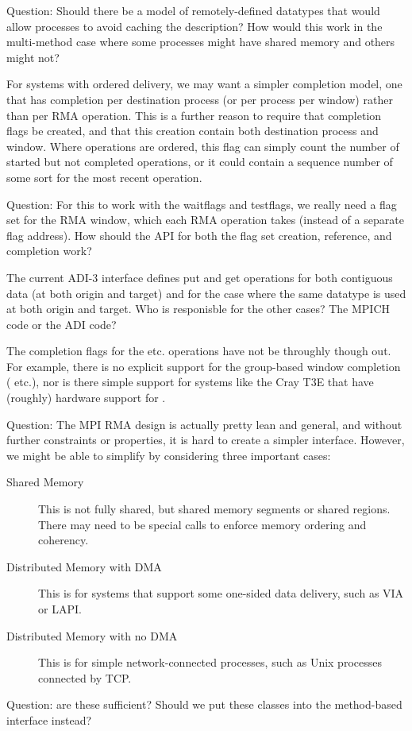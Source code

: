 \documentclass{article}
\begin{document}
Question:  Should there be a model of remotely-defined datatypes that
would allow processes to avoid caching the description?  How would
this work in the multi-method case where some processes might have
shared memory and others might not?

For systems with ordered delivery, we may want a simpler completion
model, one that has completion per destination process (or per process
per window) rather than per RMA operation.  This is a further reason
to require that completion flags be created, and that this creation
contain both destination process and window.  Where operations are
ordered, this flag can simply count the number of started but not
completed operations, or it could contain a sequence number of some
sort for the most recent operation.  

Question:  For this to work with the waitflags and testflags, we
really need a flag set for the RMA window, which each RMA operation
takes (instead of a separate flag address).  How should the API for
both the flag set creation, reference, and completion work?  

The current ADI-3 interface defines put and get operations for both
contiguous data (at both origin and target) and for the case where the
same datatype is used at both origin and target.  Who is responisble
for the other cases?  The MPICH code or the ADI code?

The completion flags for the  etc. operations
have not be throughly though out.  For example, there is no explicit
support for the group-based window completion (
etc.), nor is there simple support for systems like the Cray T3E that
have (roughly) hardware support for .

Question: The MPI RMA design is actually pretty lean and general, and
without further constraints or properties, it is hard to create a
simpler interface.  However, we might be able to simplify by
considering three important cases:
\begin{description}
\item[Shared Memory]This is not fully shared, but shared memory
segments or shared  regions. There may need to be special
calls to enforce memory ordering and coherency.
\item[Distributed Memory with DMA]This is for systems that support
some one-sided data delivery, such as VIA or LAPI.
\item[Distributed Memory with no DMA]This is for simple
network-connected processes, such as Unix processes connected by TCP.
\end{description}
Question: are these sufficient?  Should we put these classes into the
method-based interface instead?
\end{document}
